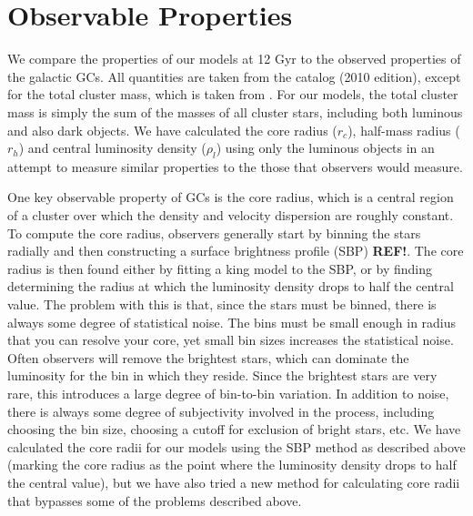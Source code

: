 \documentclass[12pt,preprint]{aastex}
\begin{document}


\section{Observable Properties}

We compare the properties of our models at 12 Gyr to the observed properties of the galactic GCs. All quantities are taken from the \cite{Harris1996} catalog (2010 edition), except for the total cluster mass, which is taken from \cite{Gnedin1997}. For our models, the total cluster mass is simply the sum of the masses of all cluster stars, including both luminous and also dark objects. We have calculated the core radius ($r_c$), half-mass radius ($r_h$) and central luminosity density ($\rho_l$) using only the luminous objects in an attempt to measure similar properties to the those that observers would measure. 

One key observable property of GCs is the core radius, which is a central region of a cluster over which the density and velocity dispersion are roughly constant. To compute the core radius, observers generally start by binning the stars radially and then constructing a surface brightness profile (SBP) \textbf{REF!}. The core radius is then found either by fitting a king model to the SBP, or by finding determining the radius at which the luminosity density drops to half the central value. The problem with this is that, since the stars must be binned, there is always some degree of statistical noise. The bins must be small enough in radius that you can resolve your core, yet small bin sizes increases the statistical noise. Often observers will remove the brightest stars, which can dominate the luminosity for the bin in which they reside. Since the brightest stars are very rare, this introduces a large degree of bin-to-bin variation. In addition to noise, there is always some degree of subjectivity involved in the process, including choosing the bin size, choosing a cutoff for exclusion of bright stars, etc. We have calculated the core radii for our models using the SBP method as described above (marking the core radius as the point where the luminosity density drops to half the central value), but we have also tried a new method for calculating core radii that bypasses some of the problems described above.
\end{document}
